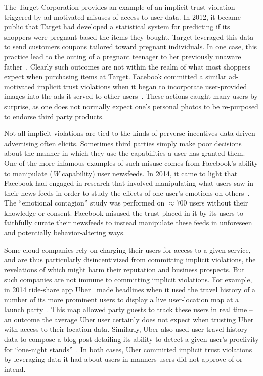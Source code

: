 The Target Corporation provides an example of an implicit trust
violation triggered by ad-motivated misuses of access to user data. In
2012, it became public that Target had developed a statistical system
for predicting if its shoppers were pregnant based the items they
bought. Target leveraged this data to send customers coupons tailored
toward pregnant individuals. In one case, this practice lead to the
outing of a pregnant teenager to her previously unaware
father~\cite{hill2012}. Clearly such outcomes are not within the realm
of what most shoppers expect when purchasing items at Target. Facebook
committed a similar ad-motivated implicit trust violations when it
began to incorporate user-provided images into the ads it served to
other users~\cite{mashable-socialads}. These actions caught many users
by surprise, as one does not normally expect one's personal photos to
be re-purposed to endorse third party products.

Not all implicit violations are tied to the kinds of perverse
incentives data-driven advertising often elicits. Sometimes third
parties simply make poor decisions about the manner in which they use
the capabilities a user has granted them. One of the more infamous
examples of such misuse comes from Facebook's ability to manipulate
(\emph{W} capability) user newsfeeds. In 2014, it came to light that
Facebook had engaged in research that involved manipulating what users
saw in their news feeds in order to study the effects of one user's
emotions on others~\cite{goel2014}. The ``emotional contagion'' study
was performed on $\approx700$ users without their knowledge or
consent. Facebook misused the trust placed in it by its users to
faithfully curate their newsfeeds to instead manipulate these feeds in
unforeseen and potentially behavior-altering ways.

Some cloud companies rely on charging their users for access to a
given service, and are thus particularly disincentivized from
committing implicit violations, the revelations of which might harm
their reputation and business prospects. But such companies are not
immune to committing implicit violations. For example, in 2014
ride-share app Uber~\cite{uber} made headlines when it used the travel
history of a number of its more prominent users to display a live
user-location map at a launch party~\cite{sims2014}. This map allowed
party guests to track these users in real time -- an outcome the
average Uber user certainly does not expect when trusting Uber with
access to their location data. Similarly, Uber also used user travel
history data to compose a blog post detailing its ability to detect a
given user's proclivity for ``one-night
stands''~\cite{pagliery2014}. In both cases, Uber committed implicit
trust violations by leveraging data it had about users in manners
users did not approve of or intend.

